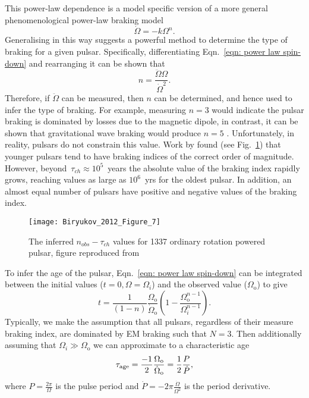 This power-law dependence is a model specific version of a more general
phenomenological power-law braking model
\begin{equation}
    \dot{\Omega} = -k \Omega^{n}.
    \label{eqn: power law spin-down}
\end{equation}
Generalising in this way suggests a powerful method to determine the type of
braking for a given pulsar. Specifically, differentiating Eqn.~\eqref{eqn: power law spin-down}
and rearranging it can be shown that
\begin{equation}
    n = \frac{\ddot{\Omega}\Omega}{\dot{\Omega}^{2}}.
    \label{eqn: measured braking index}
\end{equation}
Therefore, if $\ddot{\Omega}$ can be measured, then $n$ can be determined, and
hence used to infer the type of braking. For example, measuring $n=3$ would
indicate the pulsar braking is dominated by losses due to the magnetic dipole,
in contrast, it can be shown that gravitational wave braking would produce
$n=5$ \citep{Shapiro83}. Unfortunately, in reality, pulsars do not constrain this
value. Work by \citet{Biryukov2012} found (see Fig.~\ref{fig: biryukov}) that
younger pulsars tend to have braking indices of the correct order of
magnitude. However, beyond~$\tau_{ch}\approx10^{5}$~years
the absolute value of the braking index rapidly grows,
reaching values as large as $10^{6}$~yrs for the oldest pulsar. In addition, an
almost equal number of pulsars have positive and negative values of the braking
index.
\begin{figure}[htb]
\centering
\texttt{[image: Biryukov\_2012\_Figure\_7]}
\caption{The inferred $n_{obs}-\tau_{ch}$ values for 1337 ordinary rotation
powered pulsar, figure reproduced from \citet{Biryukov2012}}
\label{fig: biryukov}
\end{figure}

To infer the age of the pulsar, Eqn.~\eqref{eqn: power law spin-down} can
be integrated between the initial values ($t=0, \Omega=\Omega_{i}$) and the
observed value ($\Omega_{\mathrm{o}}$) to give
\begin{equation}
    t = \frac{1}{(1-n)} \frac{\Omega_{\mathrm{o}}}{\dot\Omega_{\mathrm{o}}} 
        \left(1 - \frac{\Omega_{\mathrm{o}}^{n-1}}{\Omega_{i}^{n-1}}\right).
\label{eqn: characteristic age}
\end{equation}
Typically, we make the assumption that all
pulsars, regardless of their measure braking index, are dominated by EM braking
such that $N=3$. Then additionally assuming that $\Omega_{i} \gg
\Omega_{\mathrm{o}}$ we can approximate to a characteristic age
\begin{equation}
    \tau_{\mathrm{age}} = \frac{-1}{2}\frac{\Omega_{\mathrm{o}}}{\dot\Omega_{\mathrm{o}}}
         = \frac{1}{2}\frac{P}{\dot{P}},
\end{equation}
where $P=\frac{2\pi}{\Omega}$ is the pulse period and
$\dot{P}=-2\pi\frac{\dot{\Omega}}{\Omega^{2}}$ is the period derivative.

